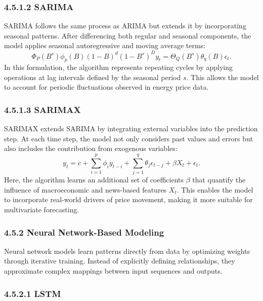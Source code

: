 \documentclass[pdflatex,sn-mathphys-num]{sn-jnl}%
\theoremstyle{thmstyleone}%
\theoremstyle{thmstyletwo}%
\theoremstyle{thmstylethree}%
\begin{document}
\subsubsection*{4.5.1.2 SARIMA}

SARIMA follows the same process as ARIMA but extends it by incorporating seasonal patterns. After differencing both regular and seasonal components, the model applies seasonal autoregressive and moving average terms:
\begin{equation}
 \Phi_P(B^s)\phi_p(B)(1-B)^d(1-B^s)^D y_t = \Theta_Q(B^s)\theta_q(B)\epsilon_t.
\label{eq:sarima}
\end{equation}
In this formulation, the algorithm represents repeating cycles by applying operations at lag intervals defined by the seasonal period $s$. This allows the model to account for periodic fluctuations observed in energy price data.

\subsubsection*{4.5.1.3 SARIMAX}

SARIMAX extends SARIMA by integrating external variables into the prediction step. At each time step, the model not only considers past values and errors but also includes the contribution from exogenous variables:
\begin{equation}
 y_t = c + \sum_{i=1}^{p} \phi_i y_{t-i} + \sum_{j=1}^{q} \theta_j \epsilon_{t-j} + \beta X_t + \epsilon_t.
\label{eq:sarimax}
\end{equation}
Here, the algorithm learns an additional set of coefficients $\beta$ that quantify the influence of macroeconomic and news-based features $X_t$. This enables the model to incorporate real-world drivers of price movement, making it more suitable for multivariate forecasting.

\subsubsection*{4.5.2 Neural Network-Based Modeling}\label{subsubsec:neuralmodeling}

Neural network models learn patterns directly from data by optimizing weights through iterative training. Instead of explicitly defining relationships, they approximate complex mappings between input sequences and outputs.

\subsubsection*{4.5.2.1 LSTM}
\end{document}
